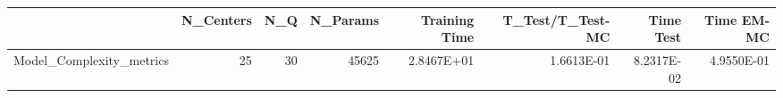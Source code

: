 \begin{tabular}{lrrrrrrr}
\toprule
{} &  N\_Centers &  N\_Q &  N\_Params &  Training Time &  T\_Test/T\_Test-MC &  Time Test &  Time EM-MC \\
\midrule
Model\_Complexity\_metrics &         25 &   30 &     45625 &     2.8467E+01 &        1.6613E-01 & 8.2317E-02 &  4.9550E-01 \\
\bottomrule
\end{tabular}
